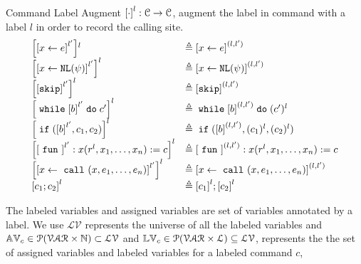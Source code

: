{%
\begin{defn} 
  \label{def:comlabel_aug}
  Command Label Augment $ \clabel{\cdot}^{l} : {\cdom \to \cdom}$, augment the label in command with a label $l$ 
in order to record the calling site.
\[
\begin{array}{ll}
  \clabel{\clabel{\assign{x}{\expr}}^{l'}}{}^{l} & \triangleq \clabel{\assign{x}{\expr}}^{(l, l')}\\
  \clabel{\clabel{\assign{x}{\query(\qexpr)}}^{l'}}^{l} & \triangleq \clabel{\assign{x}{\query(\qexpr)}}^{(l, l')}\\
  \clabel{\clabel{\eskip}^{l'}}^{l} & \triangleq \clabel{\eskip}^{(l, l')}\\
  \clabel{\ewhile \clabel{\bexpr}^{l'} \edo {c'}}^{l} & \triangleq \ewhile \clabel{\bexpr}^{(l, l')} \edo {(c')^{l}}\\
  \clabel{\eif(\clabel{\bexpr}^{l'} , {c_1}, {c_2})}^{l}  & \triangleq \eif(\clabel{\bexpr}^{(l, l')} , {(c_1)^{l}}, {(c_2)^{l}})\\
  \clabel{\clabel{\efun}^{l'}: x(r^l, x_1, \ldots, x_n) := c}^{l} & \triangleq \clabel{\efun}^{(l, l')}: x(r^l, x_1, \ldots, x_n) := c \\
  \clabel{\clabel{\assign{x}{\ecall(x, e_1, \ldots, e_n)}}^{l'}}^{l} & \triangleq \clabel{\assign{x}{\ecall(x, e_1, \ldots, e_n)}}^{(l, l')}\\
  \clabel{{c_1};{c_2}}^{l} &  \triangleq \clabel{c_1}^{l};\clabel{c_2}^{l}
\end{array}
\]
\end{defn}
The labeled variables and assigned variables are set of variables annotated by a label. 
We use  
$\mathcal{LV}$ represents the universe of all the labeled variables and 
$\mathbb{AV}_c \in \mathcal{P}(\mathcal{VAR} \times \mathbb{N}) \subset \mathcal{LV}$ and 
$\mathbb{LV}_c \in \mathcal{P}(\mathcal{VAR} \times \mathcal{L}) \subseteq \mathcal{LV}$,
represents the the set of assigned variables and labeled variables for a labeled command $c$,
}
